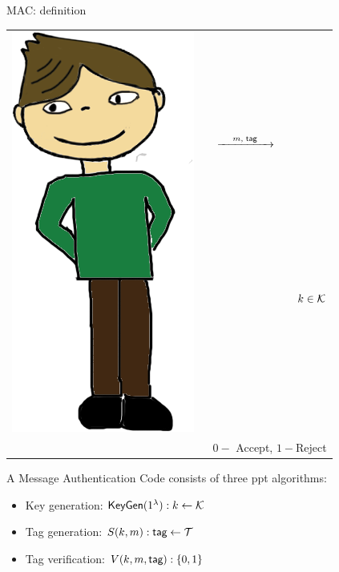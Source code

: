 \documentclass[usenames,dvipsnames, 9pt]{beamer}
\begin{document}
\begin{frame}{MAC: definition}
\begin{center}
\begin{tabular}{c c c c c}
		\multirow{5}{*}{\includegraphics[scale=0.18]{Bob}} &  \\
		&  & \Huge $\xrightarrow{\mkern25mu m, \; \textsf{tag} \mkern25mu}$ & &  \\ 
		\LARGE $k \in \keyS$ &   & &  & $k \in \keyS$ \\[10pt]
		$\mactag \leftarrow S(k,m)$   & & &  & \pause   \\ [20pt] 
		\multicolumn{5}{r}{$V(k,m, \mactag) \in \{ 0, 1\}$ }  \\
		\multicolumn{5}{r}{$0-$ Accept, $1-$Reject}  
	\end{tabular}
\end{center}
\pause
\large
A {\color{Orange} Message Authentication Code } consists of three ppt algorithms:
\vspace{-2pt}
\begin{itemize}
	\item Key generation: $\textsf{KeyGen}(1^\lambda): k \leftarrow \mathcal{K}$ \\[4pt]
	\item Tag generation: $S(k, m): \textsf{tag} \leftarrow \mathcal{T}$ \\[4pt]
	\item Tag verification: $V(k, m, \textsf{tag}): \{0, 1\}  $
\end{itemize}
\end{frame}
\end{document}
